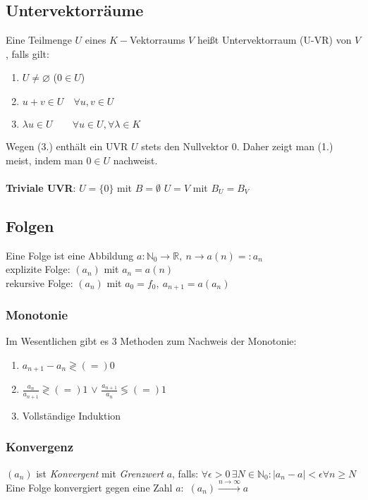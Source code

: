 \documentclass[6pt,a4paper]{scrartcl}
\newcommand{\abs}[1]{\ensuremath{\left\vert#1\right\vert}}
\begin{document}
\begin{multicols}{4}
\subsection{Untervektorräume}
Eine Teilmenge $U$ eines $K-$Vektorraums $V$ heißt Untervektorraum (U-VR) von $V$, falls gilt:
\begin{enumerate}\itemsep0pt
\item $U\neq \varnothing$ \qquad ($0\in U$)
\item $u+v\in U \quad \forall u,v\in U$
\item $\lambda u \in U \qquad \forall u\in U,\forall \lambda \in K$
\end{enumerate}
Wegen (3.) enthält ein UVR $U$ stets den Nullvektor $0$. Daher zeigt man (1.) meist, indem man $0\in U$ nachweist.\\
\\
\textbf{Triviale UVR}: $U=\{0\}$ mit $B = \emptyset$ \qquad $U=V$ mit $B_U=B_V$



\subsection{Folgen}
Eine Folge ist eine Abbildung $a: \mathbb N_0 \rightarrow \mathbb R,\ n \rightarrow a(n) =: a_n$\\
explizite Folge: $(a_n)$ mit $a_n=a(n)$\\ rekursive Folge: $(a_n)$ mit $a_0=f_0,\  a_{n+1}=a(a_n)$\\

\subsubsection{Monotonie}
Im Wesentlichen gibt es 3 Methoden zum Nachweis der Monotonie:
\begin{enumerate}\itemsep0pt
\item $a_{n+1} - a_n \gtrless (=) 0$
\item $\frac{a_n}{a_{n+1}} \gtrless (=) 1$ \qquad $\lor$ \qquad $\frac{a_{n+1}}{a_n} \lessgtr (=) 1$
\item Vollständige Induktion
\end{enumerate}

\subsubsection{Konvergenz}
$(a_n)$ ist \emph{Konvergent} mit \emph{Grenzwert} $a$, falls: $\forall \epsilon > 0\, \exists N  \in \mathbb N_0:  \abs{a_n -a} < \epsilon  \forall n \ge N$\\
Eine Folge konvergiert gegen eine Zahl $a$:\ $(a_n) \overset{n \rightarrow \infty}{\longrightarrow} a$\\

\end{multicols}
\end{document}
